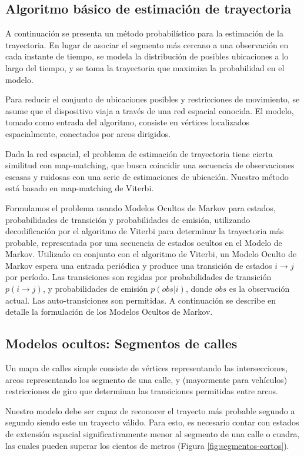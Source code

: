 \subsection{Algoritmo básico de estimación de trayectoria}
A continuación se presenta un método probabilístico para la estimación de la trayectoria. En lugar de asociar el segmento más cercano a una observación en cada instante de tiempo, se modela la distribución de posibles ubicaciones a lo largo del tiempo, y se toma la trayectoria que maximiza la probabilidad en el modelo. \par
Para reducir el conjunto de ubicaciones posibles y restricciones de movimiento, se asume que el dispositivo viaja a través de una red espacial conocida. El modelo, tomado como entrada del algoritmo, consiste en vértices localizados espacialmente, conectados por arcos dirigidos. \par
Dada la red espacial, el problema de estimación de trayectoria tiene cierta similitud con map-matching, que busca coincidir una secuencia de observaciones escasas y ruidosas con una serie de estimaciones de ubicación. Nuestro método está basado en map-matching de Viterbi.  \par
Formulamos el problema usando Modelos Ocultos de Markov para estados, probabilidades de transición y probabilidades de emisión, utilizando decodificación por el algoritmo de Viterbi para determinar la trayectoria más probable, representada por una secuencia de estados ocultos en el Modelo de Markov.
Utilizado en conjunto con el algoritmo de Viterbi, un Modelo Oculto de Markov espera una entrada periódica y produce una transición de estados $i\rightarrow j$ por período. Las transiciones son regidas por probabilidades de transición $p(i\rightarrow j)$, y probabilidades de emisión $p(obs|i)$, donde $obs$ es la observación actual. Las auto-transiciones son permitidas. A continuación se describe en detalle la formulación de los Modelos Ocultos de Markov.

\subsection{Modelos ocultos: Segmentos de calles}\label{ssec:hmm-shortsegments}

Un mapa de calles simple consiste de vértices representando las intersecciones, arcos representando los segmento de una calle, y (mayormente para vehículos) restricciones de giro que determinan las transiciones permitidas entre arcos.

Nuestro modelo debe ser capaz de reconocer el trayecto más probable segundo a segundo siendo este un trayecto válido. Para esto, es necesario contar con estados de extensión espacial significativamente menor al segmento de una calle o cuadra, las cuales pueden superar los cientos de metros (Figura \ref{fig:segmentos-cortos}). 


